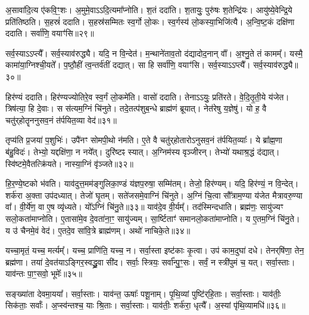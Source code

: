    अ॒सावा॑दि॒त्य ए॑कवि॒ꣳ॒शः।
   अ॒मुमे॒वाऽऽदि॒त्यमा᳚प्नोति।
   श॒तं ददा॑ति।
   श॒तायुः॒ पुरु॑षः श॒तेन्द्रि॑यः।
   आयु॑ष्ये॒वेन्द्रि॒ये प्रति॑तिष्ठति।
   स॒हस्रं॑ ददाति।
   स॒हस्र॑सम्मितः स्व॒र्गो लो॒कः।
   स्व॒र्गस्य॑ लो॒कस्या॒भिजि॑त्यै।
   अ॒न्वि॒ष्ट॒कं दक्षि॑णा ददाति।
   सर्वा॑णि॒ वयाꣳ॑सि॥२९॥

   सर्व॒स्याऽऽप्त्यै᳚।
   सर्व॒स्याव॑रुद्ध्यै।
   यदि॒ न वि॒न्देत॑।
   म॒न्थाने॑ताव॒तो द॑द्यादोद॒नान् वा᳚᳚।
   अ॒श्नु॒ते तं कामम्᳚।
   यस्मै॒ कामा॑या॒ग्निश्ची॒यते᳚।
   प॒ष्ठौ॒हीं त्व॒न्तर्व॑तीं दद्यात्।
   सा हि सर्वा॑णि॒ वयाꣳ॑सि।
   सर्व॒स्याऽऽप्त्यै᳚।
   सर्व॒स्याव॑रुद्ध्यै॥३०॥

   हिर॑ण्यं ददाति।
   हिर॑ण्यज्योतिरे॒व स्व॒र्गं लो॒कमे॑ति।
   वासो॑ ददाति।
   तेनाऽऽयुः॒ प्रति॑रते।
   वे॒दि॒तृ॒ती॒ये य॑जेत।
   त्रिष॑त्या॒ हि दे॒वाः।
   स स॑त्यम॒ग्निं चि॑नुते।
   तदे॒तत्प॑शुब॒न्धे ब्राह्म॑णं ब्रूयात्।
   नेत॑रेषु य॒ज्ञेषु॑।
   यो ह॒ वै चतु॑र्‌होतॄननुसव॒नं त॑र्पयित॒व्या\sn{} वेद॑॥३१॥

   तृप्य॑ति प्र॒जया॑ प॒शुभिः॑।
   उपै॑नꣳ सोमपी॒थो न॑मति।
   ए॒ते वै चतु॑र्‌होतारोऽनुसव॒नं त॑र्पयित॒व्याः᳚।
   ये ब्रा᳚ह्म॒णा ब॑हु॒विदः॑।
   तेभ्यो॒ यद्दक्षि॑णा॒ न नये᳚त्।
   दुरि॑ष्टꣴ स्यात्।
   अ॒ग्निम॑स्य वृञ्जीरन्।
   तेभ्यो॑ यथाश्र॒द्धं द॑द्यात्।
   स्वि॑ष्टमे॒वैतत्क्रि॑यते।
   नास्या॒ग्निं वृ॑ञ्जते॥३२॥

   हि॒र॒ण्ये॒ष्टको भ॑वति।
   याव॑दुत्त॒मम॑ङ्गुलिका॒ण्डं य॑ज्ञप॒रुषा॒ सम्मि॑तम्।
   तेजो॒ हिर॑ण्यम्।
   यदि॒ हिर॑ण्यं॒ न वि॒न्देत्।
   शर्क॑रा अ॒क्ता उप॑दध्यात्।
   तेजो॑ घृ॒तम्।
   सते॑जसमे॒वाग्निं चि॑नुते।
   अ॒ग्निं चि॒त्वा सौ᳚त्राम॒ण्या य॑जेत मैत्रावरु॒ण्या वा᳚।
   वी॒र्ये॑ण॒ वा ए॒ष व्यृ॑ध्यते।
   यो᳚ऽग्निं चि॑नु॒ते॥३३॥
   याव॑दे॒व वी॒र्यम्᳚।
   तद॑स्मिन्दधाति।
   ब्रह्म॑णः॒ सायु॑ज्यꣳ सलो॒कता॑माप्नोति।
   ए॒तासा॑मे॒व दे॒वता॑ना॒ꣳ॒ सायु॑ज्यम्।
   सा॒र्ष्टिताꣳ॑ समानलो॒कता॑माप्नोति।
   य ए॒तम॒ग्निं चि॑नु॒ते।
   य उ॑ चैनमे॒वं वेद॑।
   ए॒तदे॒व सा॑वि॒त्रे ब्राह्म॑णम्।
   अथो॑ नाचिके॒ते॥३४॥
   \anuvakamend
  
   यच्चा॒मृतं॒ यच्च॒ मर्त्यम्᳚।
   यच्च॒ प्राणि॑ति॒ यच्च॒ न।
   सर्वा॒स्ता इष्ट॑काः कृ॒त्वा।
   उप॑ काम॒दुघा॑ दधे।
   तेनर्‌षि॑णा॒ तेन॒ ब्रह्म॑णा।
   तया॑ दे॒वत॑याऽङ्गिर॒स्वद्ध्रु॒वा सी॑द।
   सर्वाः॒ स्त्रियः॒ सर्वा᳚न्पु॒ꣳ॒सः।
   सर्वं॒ न स्त्री॑पुमं च॒ यत्।
   सर्वा॒स्ताः।
   याव॑न्तः पा॒ꣳ॒सवो॒ भूमेः᳚॥३५॥

   सङ्ख्या॑ता देवमा॒यया᳚।
   सर्वा॒स्ताः।
   याव॑न्त॒ ऊषाः᳚ पशू॒नाम्।
   पृ॒थि॒व्यां पुष्टि॑र्‌हि॒ताः।
   सर्वा॒स्ताः।
   याव॑तीः॒ सिक॑ताः॒ सर्वाः᳚।
   अ॒प्स्व॑न्तश्च॒ याः श्रि॒ताः।
   सर्वा॒स्ताः।
   याव॑तीः॒ शर्क॑रा॒ धृत्यै᳚।
   अ॒स्यां पृ॑थि॒व्यामधि॑॥३६॥	

